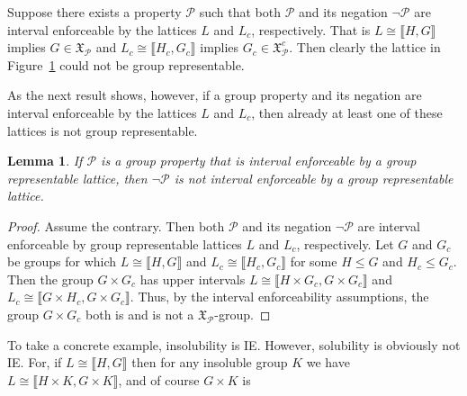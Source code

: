 \documentclass{gen-j-l}
\newcommand{\lb}{\ensuremath{\llbracket}}
\newcommand{\rb}{\ensuremath{\rrbracket}}
\newcommand{\<}{\ensuremath{\langle}}
\renewcommand{\>}{\ensuremath{\rangle}}
\theoremstyle{plain}
\newtheorem{lemma}[theorem]{Lemma}
\theoremstyle{definition}
\theoremstyle{remark}
\numberwithin{theorem}{section}
\numberwithin{claim}{section}
\numberwithin{equation}{section}
\numberwithin{conjecture}{section}
\renewcommand{\leq}{\ensuremath{\leqslant}}
\newcommand{\2}{\ensuremath{\mathbf{2}}}
\newcommand{\3}{\ensuremath{\mathbf{3}}}
\newcommand{\sG}{\ensuremath{\mathfrak{X}}}
\newcommand{\cP}{\ensuremath{\mathcal{P}}}
\newcommand{\IE}{{\small IE}}
\begin{document}
Suppose there exists a property $\cP$ such that both $\cP$ and
its negation $\neg \cP$ are interval enforceable by the lattices $L$ and $L_c$,
respectively.  That is $L\cong \lb H,G \rb$ implies $G \in \sG_\cP$ and 
$L_c\cong \lb H_c,G_c \rb$ implies $G_c\in \sG_\cP^c$.  Then clearly the
lattice in Figure~\ref{fig:twopanelchute} could not be group representable.  
\begin{figure}[!h]
  \centering
{}
\caption{}
\label{fig:twopanelchute}  
\end{figure}
As the next result shows, however, if a group property and its
negation are interval enforceable by the lattices $L$ and $L_c$, then already
at least one of these lattices is not group representable.
\begin{lemma}
\label{lemma:ie-prop-and-neg}
  If $\cP$ is a group property that is interval enforceable by a group representable lattice,
  then $\neg \cP$ is not interval enforceable by a group representable lattice.
\end{lemma}
\begin{proof}
Assume the contrary.  Then both $\cP$ and its negation $\neg \cP$
are interval enforceable by group representable lattices $L$ and $L_c$,
respectively. Let $G$ and $G_c$ be groups for which $L\cong \lb H,G \rb$ and $L_c\cong
\lb H_c,G_c \rb$ for some $H\leq G$ and $H_c\leq G_c$.
Then the group $G\times G_c$ has upper intervals 
$L\cong \lb H\times G_c, G\times G_c \rb$ and 
$L_c\cong \lb G\times H_c, G\times G_c \rb$.  Thus, by the interval enforceability
assumptions, the group $G\times G_c$ both is and is not a $\sG_\cP$-group. 
\end{proof}
To take a concrete example, insolubility is \IE.  However, solubility is
obviously not \IE. For, if $L\cong \lb H, G \rb$ then for any insoluble 
group $K$ we have $L\cong \lb H\times K, G\times K \rb$, and of course $G\times K$ is
\end{document}
